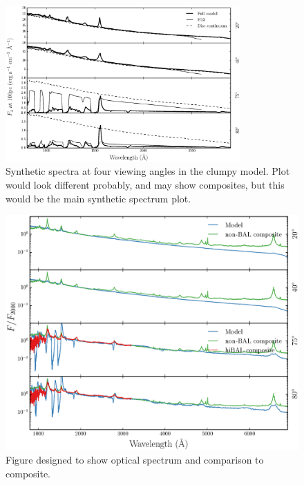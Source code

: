 \documentclass[useAMS,usenatbib]{mn2e_x}
\begin{document}
\begin{figure} %
\centering
\includegraphics[width=0.8\textwidth]{figures/uvspec.eps}
\caption
{
Synthetic spectra at four viewing angles in the clumpy model. Plot would look different probably,
and may show composites, but this would be the main synthetic spectrum plot.
}
\label{fig:uvspec}
\end{figure} %

\begin{figure} %
\centering
\includegraphics[width=1.0\textwidth]{figures/opt.eps}
\caption
{
Figure designed to show optical spectrum and comparison to composite.
}
\label{fig:uvspec}
\end{figure} %
\end{document}
